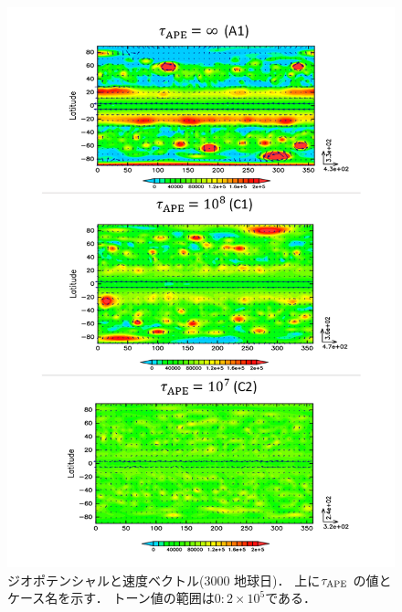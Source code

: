 \documentclass[a4j,12pt,openbib,oneside]{jreport}
\begin{document}
%
%
\begin{figure}[ht]
  \begin{center}
    \includegraphics[clip,width=14cm]{./fig/result/case2/case2_phi.png}
    \caption{
      \footnotesize{ジオポテンシャルと速度ベクトル(3000 地球日)．
上に$\tau_{\rm{APE}}$ の値とケース名を示す．
トーン値の範囲は$0:2 \times 10^5$である．
      }
    }
    \label{fig:case2_phi1}
  \end{center}
\end{figure}
%
%
\end{document}

